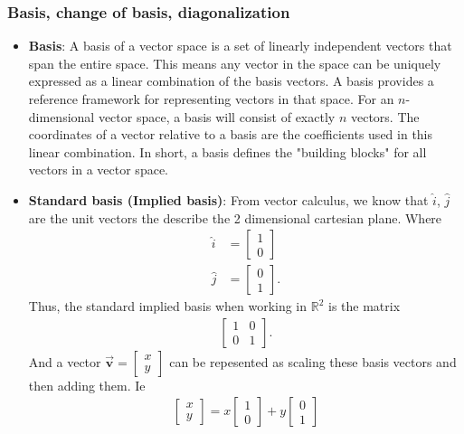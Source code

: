 \documentclass{report}
\begin{document}
    \pagebreak 
    \subsubsection{Basis, change of basis, diagonalization}
    \begin{itemize}
        \item \textbf{Basis}: A basis of a vector space is a set of linearly independent vectors that span the entire space. This means any vector in the space can be uniquely expressed as a linear combination of the basis vectors. A basis provides a reference framework for representing vectors in that space.
            \bigbreak \noindent 
            For an $n$-dimensional vector space, a basis will consist of exactly $n$ vectors. The coordinates of a vector relative to a basis are the coefficients used in this linear combination.
            \bigbreak \noindent 
            In short, a basis defines the "building blocks" for all vectors in a vector space.
        \item \textbf{Standard basis (Implied basis)}: From vector calculus, we know that $\hat{i}$, $\hat{j}$ are the unit vectors the describe the 2 dimensional cartesian plane. Where
            \begin{align*}
                \hat{i} &= \begin{bmatrix} 1 \\ 0 \end{bmatrix} \\
                \hat{j} &= \begin{bmatrix} 0 \\ 1 \end{bmatrix}
            .\end{align*}
            Thus, the standard implied basis when working in $\mathbb{R}^{2}$ is the matrix
            \begin{align*}
                \begin{bmatrix} 1 & 0 \\ 0 & 1\end{bmatrix}
            .\end{align*}
            And a vector $\vec{\mathbf{v}} = \begin{bmatrix} x \\ y \end{bmatrix} $ can be repesented as scaling these basis vectors and then adding them. Ie
            \begin{align*}
                \begin{bmatrix} x \\ y \end{bmatrix} = x \begin{bmatrix} 1 \\ 0\end{bmatrix} + y \begin{bmatrix} 0 \\ 1 \end{bmatrix}

\end{align*}
\end{itemize}
\end{document}
